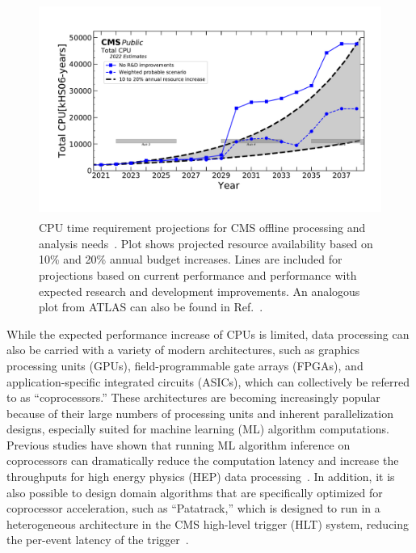 \begin{figure}[htp]
    \centering
    \includegraphics[height=7cm,trim={0 1cm 0 1cm},clip]{plots/cpu_cms2022_vectorized.pdf}
    \caption{CPU time requirement projections for CMS offline processing and analysis needs~\cite{CMS_computing_plot, CMS:2815292}. Plot shows projected resource availability based on 10\% and 20\% annual budget increases. Lines are included for projections based on current performance and performance with expected research and development improvements. An analogous plot from ATLAS can also be found in Ref.~\cite{ATLAS_computing_plot}. }
    \label{fig:CPU_needs}
\end{figure}

\begin{sloppypar}While the expected performance increase of CPUs is limited, data processing can also be carried with a variety of modern architectures, such as graphics processing units (GPUs), field-programmable gate arrays (FPGAs), and application-specific integrated circuits (ASICs), which can collectively be referred to as ``coprocessors.'' These architectures are becoming increasingly popular because of their large numbers of processing units and inherent parallelization designs, especially suited for machine learning (ML) algorithm computations. Previous studies have shown that running ML algorithm inference on coprocessors can dramatically reduce the computation latency and increase the throughputs for high energy physics (HEP) data processing~\cite{Duarte:2019fta, Krupa:2020bwg, Wang:2020fjr}. In addition, it is also possible to design domain algorithms that are specifically optimized for coprocessor acceleration, such as ``Patatrack,'' which is designed to run in a heterogeneous architecture in the CMS high-level trigger (HLT) system, reducing the per-event latency of the trigger~\cite{Bocci:2020pmi}.\end{sloppypar}


